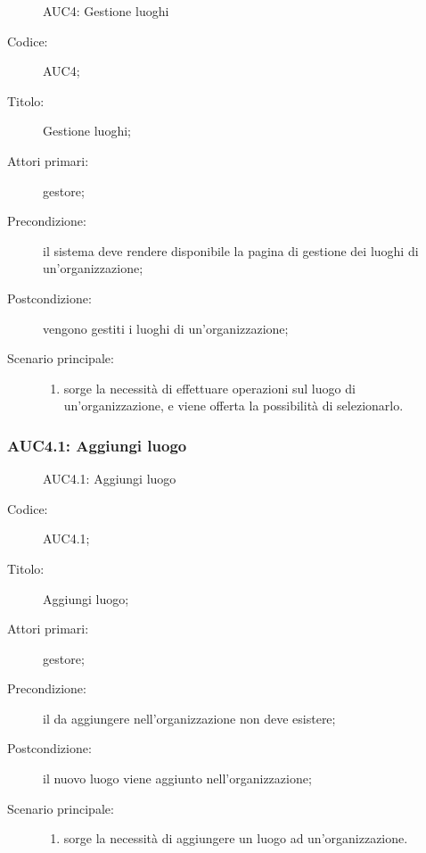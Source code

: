 
\begin{figure}[H]
  \centering
  \caption{AUC4: Gestione luoghi}%
  \label{fig:AUC4}
\end{figure}

\begin{description}
  \item[Codice:] AUC4;
  \item[Titolo:] Gestione luoghi;
  \item[Attori primari:] gestore;
  \item[Precondizione:] il sistema deve rendere disponibile la pagina di gestione dei luoghi di un'organizzazione;
  \item[Postcondizione:] vengono gestiti i luoghi di un'organizzazione;
  \item[Scenario principale:]
  \begin{enumerate}
    \item sorge la necessità di effettuare operazioni sul luogo di un'organizzazione, e viene offerta la possibilità di selezionarlo.
  \end{enumerate}
\end{description}

\subsubsection{AUC4.1: Aggiungi luogo}%
\label{subs:AUC4.1}

\begin{figure}[H]
  \centering
  \caption{AUC4.1: Aggiungi luogo}%
  \label{fig:AUC4.1}
\end{figure}

\begin{description}
  \item[Codice:] AUC4.1;
  \item[Titolo:] Aggiungi luogo;
  \item[Attori primari:] gestore;
  \item[Precondizione:] il  da aggiungere nell'organizzazione non deve esistere;
  \item[Postcondizione:] il nuovo luogo viene aggiunto nell'organizzazione;
  \item[Scenario principale:]
  \begin{enumerate}
    \item sorge la necessità di aggiungere un luogo ad un'organizzazione.
  \end{enumerate}
\end{description}

